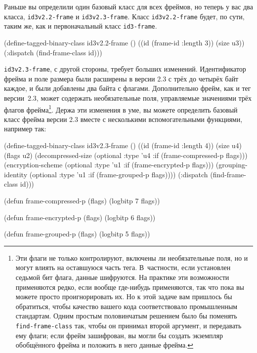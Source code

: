 Раньше вы определили один базовый класс для всех фреймов, но теперь у вас два класса,
\lstinline{id3v2.2-frame} и \lstinline{id3v2.3-frame}. Класс \lstinline{id3v2.2-frame} будет, по сути,
таким же, как и первоначальный класс \lstinline{id3-frame}.

\begin{myverb}
(define-tagged-binary-class id3v2.2-frame ()
  ((id (frame-id :length 3))
   (size u3))
  (:dispatch (find-frame-class id)))
\end{myverb}

\lstinline{id3v2.3-frame}, с другой стороны, требует больших изменений. Идентификатор фрейма и
поле размера были расширены в версии 2.3 с трёх до четырёх байт каждое, и были добавлены
два байта с флагами. Дополнительно фрейм, как и тег версии~2.3, может содержать
необязательные поля, управляемые значениями трёх флагов фрейма\footnote{Эти флаги не
  только контролируют, включены ли необязательные поля, но и могут влиять на оставшуюся
  часть тега. В~частности, если установлен седьмой бит флага, данные шифруются. На
  практике эти возможности применяются редко, если вообще где-нибудь применяются, так что
  пока вы можете просто проигнорировать их. Но к этой задаче вам пришлось бы обратиться,
  чтобы качество вашего кода соответствовало промышленным стандартам. Одним простым
  половинчатым решением было бы поменять \lstinline{find-frame-class} так, чтобы он принимал второй
  аргумент, и передавать ему флаги; если фрейм зашифрован, вы могли бы создать экземпляр
  обобщённого фрейма и положить в него данные фрейма.}\hspace{\footnotenegspace}. Держа эти изменения в уме, вы
можете определить базовый класс фрейма версии 2.3 вместе с несколькими вспомогательными
функциями, например так:

\begin{myverb}
(define-tagged-binary-class id3v2.3-frame ()
  ((id                (frame-id :length 4))
   (size              u4)
   (flags             u2)
   (decompressed-size (optional :type 'u4 :if (frame-compressed-p flags)))
   (encryption-scheme (optional :type 'u1 :if (frame-encrypted-p flags)))
   (grouping-identity (optional :type 'u1 :if (frame-grouped-p flags))))
  (:dispatch (find-frame-class id)))

(defun frame-compressed-p (flags) (logbitp 7 flags))

(defun frame-encrypted-p (flags) (logbitp 6 flags))

(defun frame-grouped-p (flags) (logbitp 5 flags))
\end{myverb}

